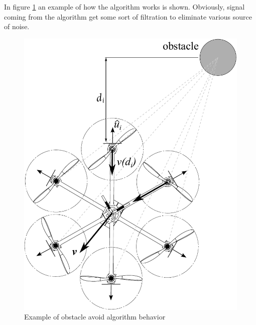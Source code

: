 In figure \ref{fig:obstavoidexample} an example of how the algorithm works is shown. Obviously, signal coming from the algorithm get some sort of filtration to eliminate various source of noise.
\begin{figure}[h]
	\centering
	\includegraphics[scale=0.45]{ch3/img/obstavoid_dist.pdf}
	\caption{Example of obstacle avoid algorithm behavior}
	\label{fig:obstavoidexample}
	\forceversofloat
\end{figure}

